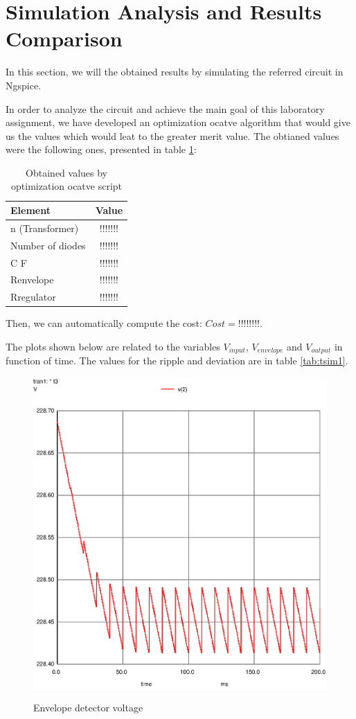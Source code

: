 \newpage
\section{Simulation Analysis and Results Comparison}
\label{sec:simulation}

In this section, we will the obtained results by simulating the referred circuit in Ngspice. 

In order to analyze the circuit and achieve the main goal of this laboratory assignment, we have developed an optimization ocatve algorithm that would give us the values which would leat to the greater merit value. The obtianed values were the following ones, presented in table \ref{tab:vsim1}:

\begin{table}[h]
    \centering
    \begin{tabular}{|l|c|}
    \hline
    {\bf Element } & {\bf Value} \\
    \hline \hline
    n (Transformer) & !!!!!!! \\
    \hline
    Number of diodes & !!!!!!! \\
    \hline
    C F & !!!!!!! \\
    \hline
    Renvelope & !!!!!!! \\
    \hline
    Rregulator  & !!!!!!! \\
    \hline
    \end{tabular}
    \caption{Obtained values by optimization ocatve script}
    \label{tab:vsim1}
\end{table}

Then, we can automatically compute the cost: $Cost = !!!!!!!!$.

The plots shown below are related to the variables $V_{input}$, $V_{envelope}$ and $V_{output}$ in function of time. The values for the ripple and deviation are in table \ref{tab:tsim1}.

\begin{figure}[!ht] \centering
\caption{Envelope detector voltage}
\includegraphics[width=0.6\linewidth]{venv.eps}
\label{fig:gteo1}
\end{figure}
\newpage


